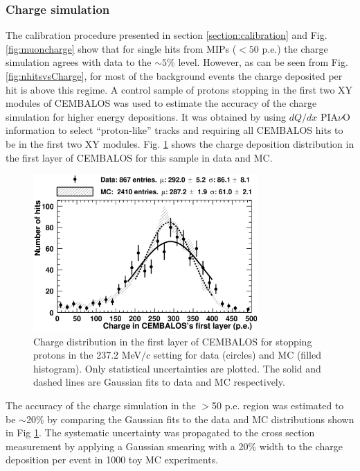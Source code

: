 \subsubsection{\bf Charge simulation}
The calibration procedure presented in section \ref{section:calibration} and Fig. \ref{fig:muoncharge} show that for single hits from MIPs ($<50$ p.e.) the charge simulation agrees with data to the $\sim5$\% level. However, as can be seen from Fig. \ref{fig:nhitsvsCharge}, for most of the background events the charge deposited per hit is above this regime. A control sample of protons stopping in the first two XY modules of CEMBALOS was used to estimate the accuracy of the charge simulation for higher energy depositions. It was obtained by using $dQ/dx$ PIA$\nu$O information to select ``proton-like'' tracks and requiring all CEMBALOS hits to be in the first two XY modules. Fig. \ref{fig:proton_sample} shows the charge deposition distribution in the first layer of CEMBALOS for this sample in data and MC.
\begin{figure}[ht]
 \includegraphics[width=86mm]{figures/proton_contained_1stlayer.eps}
 \caption{Charge distribution in the first layer of CEMBALOS for stopping protons in the 237.2 MeV$/c$ setting for data (circles) and MC (filled histogram). Only statistical uncertainties are plotted. The solid and dashed lines are Gaussian fits to data and MC respectively.}
 \label{fig:proton_sample}
\end{figure}

The accuracy of the charge simulation in the $>$50 p.e. region was estimated to be $\sim$20\% by comparing the Gaussian fits to the data and MC distributions shown in Fig \ref{fig:proton_sample}. The systematic uncertainty was propagated to the cross section measurement by applying a Gaussian smearing with a 20\% width to the charge deposition per event in 1000 toy MC experiments.

